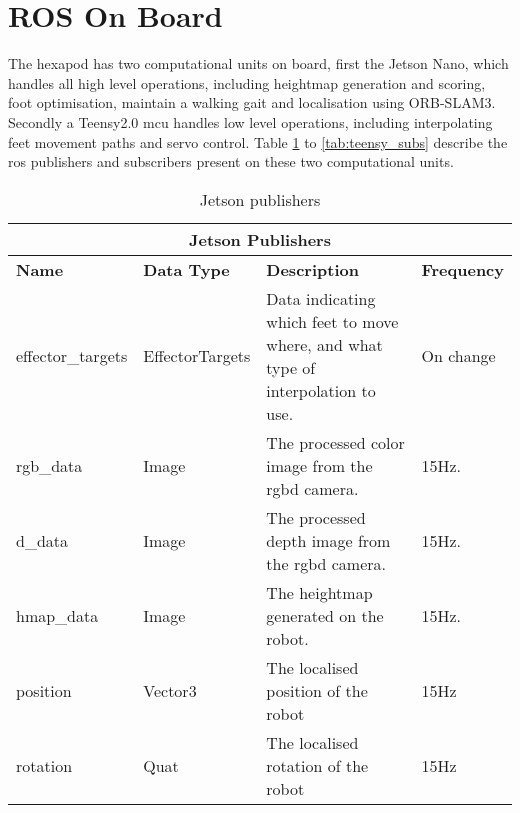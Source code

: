 \section{ROS On Board} \label{sec:on_board_ros}
    The hexapod has two computational units on board, first the Jetson Nano, which handles all high level operations, including heightmap generation and scoring,
    foot optimisation, maintain a walking gait and localisation using ORB-SLAM3. Secondly a Teensy2.0 \ac{mcu} handles low level operations, including interpolating feet movement paths
    and servo control. Table \ref{tab:jetson_pubs} to \ref{tab:teensy_subs} describe the \ac{ros} publishers and subscribers present on these two computational units.
    \begin{table}[h]
        \centering
        \begin{tabularx}{\textwidth}{| l | l | X | l |}
            \hline
            \multicolumn{4}{|c|}{\textbf{Jetson Publishers}} \\ \hline
            \textbf{Name} & \textbf{Data Type} & \textbf{Description} & \textbf{Frequency} \\ \hline
            effector\_targets & EffectorTargets & Data indicating which feet to move where, and what type of interpolation to use. & On change\\ \hline
            rgb\_data & Image & The processed color image from the \ac{rgbd} camera. & 15Hz. \\ \hline
            d\_data & Image & The processed depth image from the \ac{rgbd} camera. & 15Hz. \\ \hline
            hmap\_data & Image & The heightmap generated on the robot. & 15Hz. \\ \hline
            position & Vector3 & The localised position of the robot & 15Hz \\ \hline
            rotation & Quat & The localised rotation of the robot & 15Hz \\ \hline
        \end{tabularx}
        \caption{Jetson publishers}
        \label{tab:jetson_pubs}
    \end{table}

